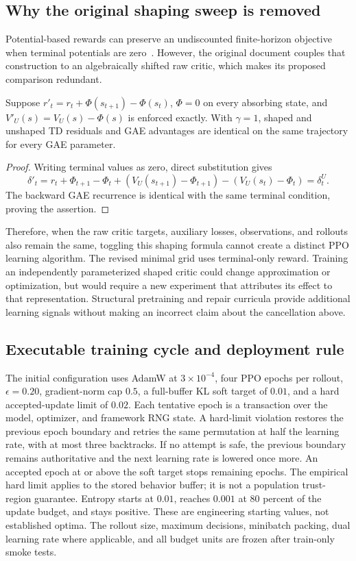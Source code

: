 \subsection{Why the original shaping sweep is removed}

Potential-based rewards can preserve an undiscounted finite-horizon objective when terminal
potentials are zero~\cite{shaping1999}. However, the original document couples that construction to
an algebraically shifted raw critic, which makes its proposed comparison redundant.

\begin{proposition}
Suppose \(r'_t=r_t+\Phi(s_{t+1})-\Phi(s_t)\), \(\Phi=0\) on every absorbing state, and
\(V'_U(s)=V_U(s)-\Phi(s)\) is enforced exactly. With \(\gamma=1\), shaped and unshaped TD
residuals and GAE advantages are identical on the same trajectory for every GAE parameter.
\end{proposition}
\begin{proof}
Writing terminal values as zero, direct substitution gives
\[
 \delta'_t=r_t+\Phi_{t+1}-\Phi_t+
 (V_U(s_{t+1})-\Phi_{t+1})-(V_U(s_t)-\Phi_t)
 =\delta_t^U.
\]
The backward GAE recurrence is identical with the same terminal condition, proving the assertion.
\end{proof}

Therefore, when the raw critic targets, auxiliary losses, observations, and rollouts also remain
the same, toggling this shaping formula cannot create a distinct PPO learning algorithm. The revised
minimal grid uses terminal-only reward. Training an independently parameterized shaped critic could
change approximation or optimization, but would require a new experiment that attributes its effect
to that representation. Structural pretraining and repair curricula provide additional learning
signals without making an incorrect claim about the cancellation above.

\subsection{Executable training cycle and deployment rule}

The initial configuration uses AdamW at \(3\times10^{-4}\), four PPO epochs per rollout,
\(\epsilon=0.20\), gradient-norm cap \(0.5\), a full-buffer KL soft target of \(0.01\), and a
hard accepted-update limit of \(0.02\). Each tentative epoch is a transaction over the model,
optimizer, and framework RNG state. A hard-limit violation restores the previous epoch boundary
and retries the same permutation at half the learning rate, with at most three backtracks. If no
attempt is safe, the previous boundary remains authoritative and the next learning rate is lowered
once more. An accepted epoch at or above the soft target stops remaining epochs. The empirical
hard limit applies to the stored behavior buffer; it is not a population trust-region guarantee.
Entropy starts at \(0.01\), reaches \(0.001\) at 80 percent of the update budget, and stays
positive. These are engineering starting values, not established optima. The rollout size, maximum
decisions, minibatch packing, dual learning rate where applicable, and all budget units are frozen
after train-only smoke tests.

